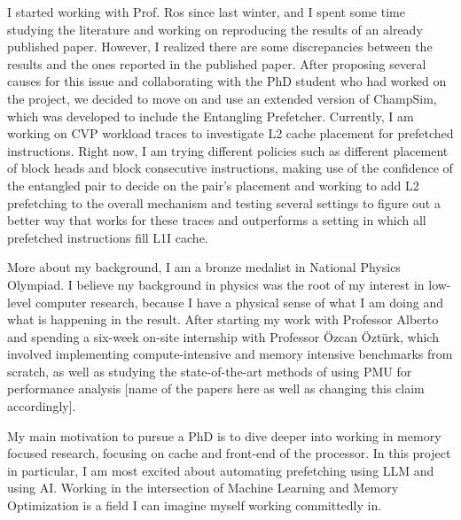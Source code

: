 \documentclass[11pt,a4paper]{article}
\begin{document}
I started working with Prof. Ros since last winter, and I spent 
some time studying the literature and working on reproducing the 
results of an already published paper. However, I realized there are some discrepancies between 
the results and the ones reported in the published paper. After proposing several causes for this issue 
and collaborating with the PhD student who had worked on the project, we decided to move on and use 
an extended version of ChampSim, which was developed to include the Entangling Prefetcher.
Currently, I am working on CVP workload traces to investigate L2 cache placement 
for prefetched instructions. Right now, I am trying different 
policies such as different placement of block heads and block consecutive instructions, 
making use of the confidence of the entangled pair to decide on the pair's placement and working to add L2 prefetching to the overall mechanism and testing 
several settings to figure out a better way that works for these traces 
and outperforms a setting in which all prefetched instructions fill 
L1I cache.

More about my background, I am a bronze medalist in National Physics Olympiad. 
I believe my background in physics was the root of my interest in 
low-level computer research, because I have a physical sense of what 
I am doing and what is happening in the result. After starting my work with 
Professor Alberto and spending a six-week on-site internship with 
Professor \"Ozcan \"Ozt\"urk, which involved implementing compute-intensive and 
memory intensive benchmarks from scratch, as well as studying the state-of-the-art 
methods of using PMU for performance analysis [name of the papers here as well as changing this claim accordingly].

My main motivation to pursue a PhD is to dive deeper into working 
in memory focused research, focusing on cache and front-end of the processor.
In this project in particular, I am most excited about automating 
prefetching using LLM and using AI. Working in the intersection of Machine Learning and 
Memory Optimization is a field I can imagine myself working committedly in.
\end{document}
